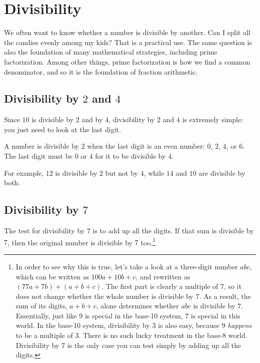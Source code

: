 \chapter{Divisibility}
\label{ch:divisibility}

We often want to know whether a number is divisible by another. Can I split all the candies evenly among my kids? That is a practical use. The same question is also the foundation of many mathematical strategies, including prime factorization. Among other things, prime factorization is how we find a common denominator, and so it is the foundation of fraction arithmetic.

\section{Divisibility by $2$ and $4$}

Since $10$ is divisible by $2$ and by $4$, divisibility by $2$ and $4$ is extremely simple: you just need to look at the last digit.

A number is divisible by $2$ when the last digit is an even number: $0$, $2$, $4$, or $6$. The last digit must be $0$ or $4$ for it to be divisible by $4$.

For example, $12$ is divisible by $2$ but not by $4$, while $14$ and $10$ are divisible by both.

\section{Divisibility by $7$}

The test for divisibility by $7$ is to add up all the digits. If that sum is divisible by $7$, then the original number is divisible by $7$ too.\footnote{In order to see why this is true, let's take a look at a three-digit number $abc$, which can be written as $100a + 10b + c$, and rewritten as $(77a + 7b) + (a + b + c)$. The first part is clearly a multiple of $7$, so it does not change whether the whole number is divisible by $7$. As a result, the sum of its digits, $a + b + c$, alone determines whether $abc$ is divisible by $7$. Essentially, just like $9$ is special in the base-10 system, $7$ is special in this world. In the base-10 system, divisibility by $3$ is also easy, because $9$ \emph{happens} to be a multiple of $3$. There is no such lucky treatment in the base-8 world. Divisibility by $7$ is the only case you can test simply by adding up all the digits.}

